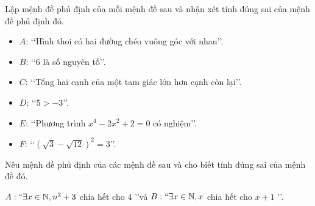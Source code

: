 \begin{bt}%
	Lập mệnh đề phủ định của mỗi mệnh đề sau và nhận xét tính  đúng sai của mệnh đề phủ định đó.
	\begin{itemize}
		\item $A$: \lq\lq Hình thoi có hai  đường chéo vuông góc với nhau\rq\rq.
		\item $B$: \lq\lq $6$ là số nguyên  tố\rq\rq.
		\item $C$: \lq\lq Tổng hai cạnh của một tam giác lớn hơn  cạnh còn lại\rq\rq.
		\item $D$: \lq\lq  $5>-3$\rq\rq.
		\item  $E$: \lq\lq Phương trình $x^4-2x^2+2=0$ có nghiệm\rq\rq.
		\item $F$:  \lq\lq $\left(\sqrt{3}-\sqrt{12}\right)^2=3$\rq\rq.
	\end{itemize}
\end{bt}

\begin{bt}%
	Nêu mệnh đề phủ định của các mệnh đề sau  và cho biết tính đúng sai của mệnh đề đó.
	\begin{center}
		$A: \lq\lq \exists x\in\mathbb{N}, n^2+3$ chia hết cho $4$ \rq\rq và $B: \lq\lq \exists x\in\mathbb{N}, x$ chia hết cho $x+1$  \rq\rq.
	\end{center}
\end{bt}


